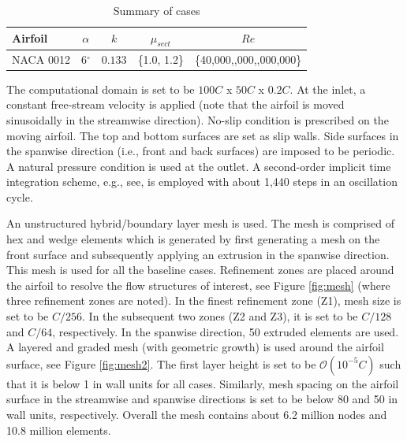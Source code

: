 \begin{table}[H]
\centering
\caption{Summary of cases}
\label{table:summary_cases}
\begin{tabular}{|l|c|c|c|c|}
\hline
Airfoil   & $\alpha$ & $k$ & $\mu_{sect}$ & $Re$ \\
\hline
\hline
NACA 0012 & 6$^\circ$ & $0.133$ & \{1.0, 1.2\} & \{40,000,\; 200,000,\; 1,000,000\} \\
\hline
\end{tabular}
\end{table}

The computational domain is set to be $100C$ x $50C$ x $0.2C$.
At the inlet, a constant free-stream velocity is applied
(note that the airfoil is moved sinusoidally in the streamwise direction).
No-slip condition is prescribed on the moving airfoil.
The top and bottom surfaces are set as slip walls.
Side surfaces in the spanwise direction (i.e., front and back surfaces) are imposed to be periodic.
A natural pressure condition is used at the outlet.
A second-order implicit time integration scheme, e.g., see\cite{bib:tran2017b}, is employed with about 1,440 steps in an oscillation cycle.

An unstructured hybrid/boundary layer mesh is used.
The mesh is comprised of hex and wedge elements which is generated by first generating a mesh on the front surface and subsequently applying an extrusion in the spanwise direction. This mesh is used for all the baseline cases.
Refinement zones are placed around the airfoil to resolve the flow structures of interest, see Figure \ref{fig:mesh} (where three refinement zones are noted).
In the finest refinement zone (Z1), mesh size is set to be $C/256$.
In the subsequent two zones (Z2 and Z3), it is set to be $C/128$ and $C/64$, respectively.
In the spanwise direction, 50 extruded elements are used.
A layered and graded mesh (with geometric growth) is used around the airfoil surface, see Figure \ref{fig:mesh2}.
The first layer height is set to be $\mathcal{O}(10^{-5} C)$ such that it is below 1 in wall units for all cases.
Similarly, mesh spacing on the airfoil surface in the streamwise and spanwise directions is set to be below 80 and 50 in wall units, respectively.
Overall the mesh contains about 6.2 million nodes and 10.8 million elements.

